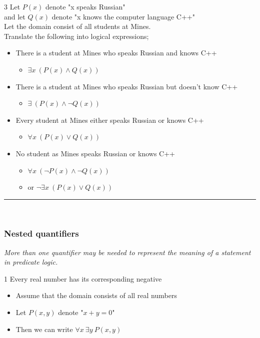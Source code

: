 \documentclass[12pt, letterpaper]{article}
\newcommand{\exheader}[1][ex]{{\tiny{#1}\normalsize}}
\newcommand{\horizline}[0]{\noindent\rule{\textwidth}{1pt}\\}
\begin{document}
\pagebreak

\exheader[3] Let $P(x)$ denote "x speaks Russian" \\
\exheader[\indent] and let $Q(x)$ denote "x knows the computer language C++" \\
\exheader[\indent] Let the domain consist of all students at Mines. \\
\exheader[\indent] Translate the following into logical expressions;
\begin{itemize}[leftmargin=*, label={}]
	\item There is a student at Mines who speaks Russian and knows C++
	\begin{itemize}
		\item $\exists x \ (P(x) \land Q(x))$
	\end{itemize}
	\item There is a student at Mines who speaks Russian but doesn't know C++
	\begin{itemize}
		\item $\exists \ (P(x) \land \neg Q(x))$
	\end{itemize}
	\item Every student at Mines either speaks Russian or knows C++
	\begin{itemize}
		\item $\forall x \ (P(x) \lor Q(x))$
	\end{itemize}
	\item No student as Mines speaks Russian or knows C++
	\begin{itemize}
		\item $\forall x \ (\neg P(x) \land \neg Q(x))$
		\item or $\neg \exists x \ (P(x) \lor Q(x))$
	\end{itemize}
\end{itemize}

\bigbreak
\horizline
\subsubsection*{Nested quantifiers}
\emph{More than one quantifier may be needed to represent the meaning of a statement in predicate logic.}

\exheader[1] Every real number has its corresponding negative
\begin{itemize}[leftmargin=0.5cm, label={}]
	\item Assume that the domain consists of all real numbers
	\item Let $P(x,y)$ denote "$x + y = 0$"
	\item Then we can write $\forall x \ \exists y \ P(x,y)$
\end{itemize}
\end{document}

